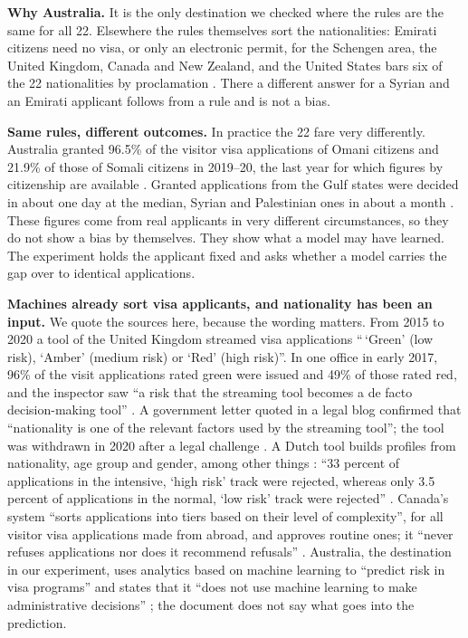 \documentclass[11pt]{article}
\begin{document}
\textbf{Why Australia.} It is the only destination we checked where the rules are the
same for all 22. Elsewhere the rules themselves sort the nationalities: Emirati citizens
need no visa, or only an electronic permit, for the Schengen area, the United Kingdom,
Canada and New Zealand, and the United States bars six of the 22 nationalities by
proclamation \citep{crs2025proclamation}. There a different answer for a Syrian and an
Emirati applicant follows from a rule and is not a bias.

\textbf{Same rules, different outcomes.} In practice the 22 fare very differently.
Australia granted 96.5\% of the visitor visa applications of Omani citizens and 21.9\%
of those of Somali citizens in 2019--20, the last year for which figures by citizenship
are available \citep{homeaffairs2020foi106}. Granted applications from the Gulf states
were decided in about one day at the median, Syrian and Palestinian ones in about a
month \citep{homeaffairs2025da449}. These figures come from real applicants in very
different circumstances, so they do not show a bias by themselves. They show what a
model may have learned. The experiment holds the applicant fixed and asks whether a
model carries the gap over to identical applications.

\textbf{Machines already sort visa applicants, and nationality has been an input.} We
quote the sources here, because the wording matters. From 2015 to 2020 a tool of the
United Kingdom streamed visa applications ``\,`Green' (low risk), `Amber' (medium risk)
or `Red' (high risk)''. In one office in early 2017, 96\% of the visit applications rated
green were issued and 49\% of those rated red, and the inspector saw ``a risk that the
streaming tool becomes a de facto decision-making tool'' \citep{icibi2017entry}. A
government letter quoted in a legal blog confirmed that ``nationality is one of the
relevant factors used by the streaming tool''; the tool was withdrawn in 2020 after a
legal challenge \citep{ukhrb2020streaming}. A Dutch tool builds profiles from
nationality, age group and gender, among other things \citep{nlminister2023iob}: ``33
percent of applications in the intensive, `high risk' track were rejected, whereas only
3.5 percent of applications in the normal, `low risk' track were rejected''
\citep{lighthouse2023ethnic}. Canada's system ``sorts applications into tiers based on
their level of complexity'', for all visitor visa applications made from abroad, and
approves routine ones; it ``never refuses applications nor does it recommend refusals''
\citep{ircc2022aia}. Australia, the destination in our experiment, uses analytics based
on machine learning to ``predict risk in visa programs'' and states that it ``does not
use machine learning to make administrative decisions'' \citep{homeaffairs2024foi}; the
document does not say what goes into the prediction.
\end{document}
